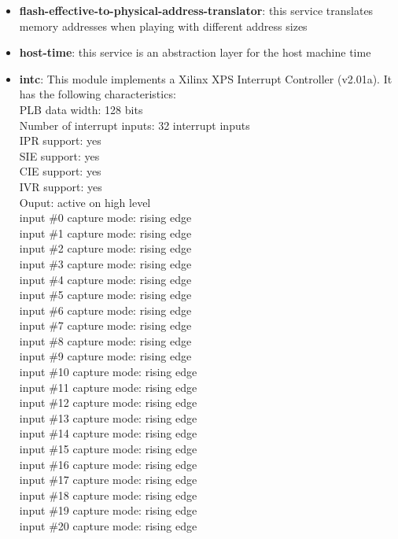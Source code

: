 \begin{itemize}
\item \textbf{flash-effective-to-physical-address-translator}: this service translates memory addresses when playing with different address sizes
\item \textbf{host-time}: this service is an abstraction layer for the host machine time
\item \textbf{intc}: This module implements a Xilinx XPS Interrupt Controller (v2.01a). It has the following characteristics:\\
PLB data width: 128 bits\\
Number of interrupt inputs: 32 interrupt inputs\\
IPR support: yes\\
SIE support: yes\\
CIE support: yes\\
IVR support: yes\\
Ouput: active on high level\\
input \#0 capture mode: rising edge\\
input \#1 capture mode: rising edge\\
input \#2 capture mode: rising edge\\
input \#3 capture mode: rising edge\\
input \#4 capture mode: rising edge\\
input \#5 capture mode: rising edge\\
input \#6 capture mode: rising edge\\
input \#7 capture mode: rising edge\\
input \#8 capture mode: rising edge\\
input \#9 capture mode: rising edge\\
input \#10 capture mode: rising edge\\
input \#11 capture mode: rising edge\\
input \#12 capture mode: rising edge\\
input \#13 capture mode: rising edge\\
input \#14 capture mode: rising edge\\
input \#15 capture mode: rising edge\\
input \#16 capture mode: rising edge\\
input \#17 capture mode: rising edge\\
input \#18 capture mode: rising edge\\
input \#19 capture mode: rising edge\\
input \#20 capture mode: rising edge\\

\end{itemize}
